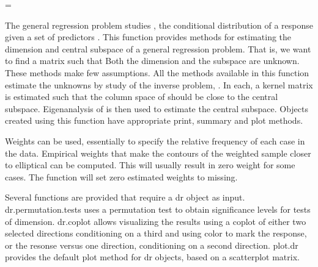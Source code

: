 \documentclass{article}
\makeatletter
\let\realnormalsize=\normalsize
\def\preveqno{}\let\real@float=\@float \let\realend@float=\end@float
\def\@float{\let\@savefreelist\@freelist\real@float}
\def\liih@math{\ifmmode$\else\bad@math\fi}
\def\end@float{\realend@float\global\let\@freelist\@savefreelist}
\def\adjustnormalsize{\def\normalsize{\mathsurround=0pt \realnormalsize
 \parindent=0pt\abovedisplayskip=0pt\belowdisplayskip=0pt}%
 \def\phantompar{\csname par\endcsname}\normalsize}%
\def\lthtmltypeout#1{{\let\protect\string \immediate\write\lthtmlwrite{#1}}}%
\newcommand\lthtmlvboxmathA{\adjustnormalsize\setbox\sizebox=\vbox\bgroup %
 \let\ifinner=\iffalse \let\)\liih@math }%
\newcommand\lthtmlboxmathZ{\@next\next\@currlist{}{\def\next{\voidb@x}}%
 \expandafter\box\next\egroup}%
\newcommand\lthtmlmathtype[1]{\gdef\lthtmlmathenv{#1}}%
\newcommand\lthtmllogmath{\lthtmltypeout{l2hSize %
:\lthtmlmathenv:\the\ht\sizebox::\the\dp\sizebox::\the\wd\sizebox.\preveqno}}%
\newcommand\lthtmlfigureA[1]{\let\@savefreelist\@freelist
       \lthtmlmathtype{#1}\lthtmlvboxmathA}%
\newcommand\lthtmlfigureZ{\lthtmlboxmathZ\lthtmllogmath\copy\sizebox
       \global\let\@freelist\@savefreelist}%
\def\lthtmlcheckvsize{\ifdim\ht\sizebox<\vsize 
  \ifdim\wd\sizebox<\hsize\expandafter\hfill\fi \expandafter\vfill
  \else\expandafter\vss\fi}%
\makeatother
\begin{document}
{\newpage\clearpage
\lthtmlfigureA{Details1801}%
\begin{Details}\relax
The general regression problem studies , the conditional
distribution of a response  given a set of predictors .  
This function provides methods for estimating the dimension and central
subspace of a general regression problem.  That is, we want to find a 
 matrix  such that 
Both the dimension  and the subspace
 are unknown.  These methods make few assumptions.  All the methods
available in this function estimate the unknowns by study of the inverse
problem, .  In each, a kernel matrix  is estimated such
that the column space of  should be close to the central subspace.
Eigenanalysis of  is then used to estimate the central subspace.
Objects created using this function have appropriate print, summary and plot
methods.
\par Weights can be used, essentially to specify the relative 
frequency of each case in the data.  Empirical weights that make 
the contours of the weighted sample closer to elliptical can be 
computed.  This will usually result in zero weight for some 
cases.  The function will set zero estimated weights to missing.
\par Several functions are provided that require a dr object as input.  
dr.permutation.tests uses a permutation test to obtain significance levels
for tests of dimension.  dr.coplot allows visualizing the results using a
coplot of either two selected directions conditioning on a third and using
color to mark the response, or the resonse versus one direction,
conditioning on a second direction.  plot.dr provides the default plot
method for dr objects, based on a scatterplot matrix.\end{Details}%
\lthtmlfigureZ
\lthtmlcheckvsize\clearpage}
\end{document}

